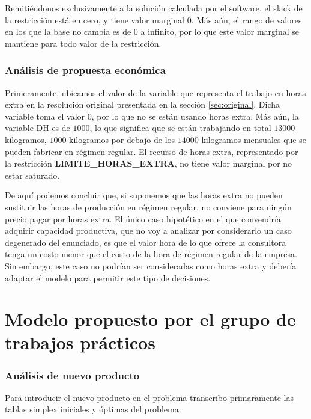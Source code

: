 \documentclass[a4paper,11pt]{article}
\begin{document}
Remitiéndonos exclusivamente a la solución calculada por el software, el slack
de la restricción está en cero, y tiene valor marginal \(0\). Más aún, el rango
de valores en los que la base no cambia es de \(0\) a infinito, por lo que este
valor marginal se mantiene para todo valor de la restricción.

\section{Análisis de propuesta económica}

Primeramente, ubicamos el valor de la variable que representa el trabajo en
horas extra en la resolución original presentada en la sección
\ref{sec:original}. Dicha variable toma el valor \(0\), por lo que no se están
usando horas extra. Más aún, la variable DH es de \(1000\), lo que significa
que se están trabajando en total \(13000\) kilogramos, \(1000\) kilogramos por
debajo de los \(14000\) kilogramos mensuales que se pueden fabricar en régimen
regular. El recurso de horas extra, representado por la restricción
\textbf{LIMITE\_HORAS\_EXTRA}, no tiene valor marginal por no estar saturado.

De aquí podemos concluir que, si suponemos que las horas extra no pueden
sustituir las horas de producción en régimen regular, no conviene para ningún
precio pagar por horas extra. El único caso hipotético en el que convendría
adquirir capacidad productiva, que no voy a analizar por considerarlo un caso
degenerado del enunciado, es que el valor hora de lo que ofrece la consultora
tenga un costo menor que el costo de la hora de régimen regular de la empresa.
Sin embargo, este caso no podrían ser consideradas como horas extra y debería
adaptar el modelo para permitir este tipo de decisiones.

\part{Modelo propuesto por el grupo de trabajos prácticos}

\section{Análisis de nuevo producto}

Para introducir el nuevo producto en el problema transcribo primaramente las
tablas simplex iniciales y óptimas del problema:
\end{document}
